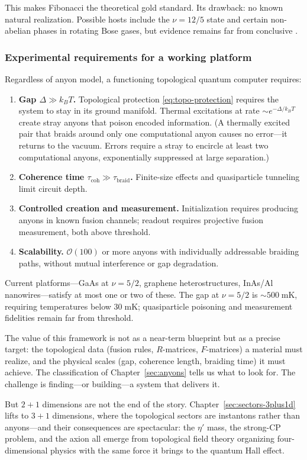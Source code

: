 This makes Fibonacci the theoretical gold standard.  Its drawback: no known natural realization.  Possible hosts include the $\nu = 12/5$ state and certain non-abelian phases in rotating Bose gases, but evidence remains far from conclusive \cite{NayakSimonSternFreedmanDasSarma2008NonabelianAnyons}.

\subsubsection*{Experimental requirements for a working platform}

Regardless of anyon model, a functioning topological quantum computer requires:
\begin{enumerate}
  \item \textbf{Gap $\Delta \gg k_B T$.}  Topological protection \eqref{eq:topo-protection} requires the system to stay in its ground manifold.  Thermal excitations at rate $\sim e^{-\Delta/k_BT}$ create stray anyons that poison encoded information.  (A thermally excited pair that braids around only one computational anyon causes no error---it returns to the vacuum.  Errors require a stray to encircle at least two computational anyons, exponentially suppressed at large separation.)
  \item \textbf{Coherence time $\tau_{\mathrm{coh}} \gg \tau_{\mathrm{braid}}$.}  Finite-size effects and quasiparticle tunneling limit circuit depth.
  \item \textbf{Controlled creation and measurement.}  Initialization requires producing anyons in known fusion channels; readout requires projective fusion measurement, both above threshold.
  \item \textbf{Scalability.}  $\mathcal{O}(100)$ or more anyons with individually addressable braiding paths, without mutual interference or gap degradation.
\end{enumerate}
Current platforms---GaAs at $\nu = 5/2$, graphene heterostructures, InAs/Al nanowires---satisfy at most one or two of these.  The gap at $\nu = 5/2$ is $\sim 500\;\mathrm{mK}$, requiring temperatures below $30\;\mathrm{mK}$; quasiparticle poisoning and measurement fidelities remain far from threshold.

The value of this framework is not as a near-term blueprint but as a precise target: the topological data (fusion rules, $R$-matrices, $F$-matrices) a material must realize, and the physical scales (gap, coherence length, braiding time) it must achieve.  The classification of Chapter~\ref{sec:anyons} tells us what to look for.  The challenge is finding---or building---a system that delivers it.

\medskip

\noindent But $2{+}1$ dimensions are not the end of the story.  Chapter~\ref{sec:sectors-3plus1d} lifts to $3{+}1$ dimensions, where the topological sectors are instantons rather than anyons---and their consequences are spectacular: the $\eta'$ mass, the strong-CP problem, and the axion all emerge from topological field theory organizing four-dimensional physics with the same force it brings to the quantum Hall effect.
